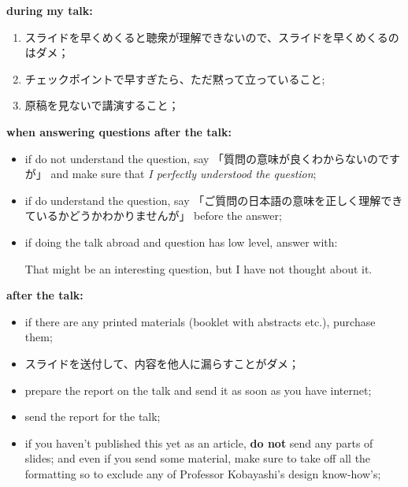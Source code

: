 \documentclass[12pt]{article} %
\begin{document}
    \textbf{during my talk:}\begin{enumerate}
	    \item スライドを早くめくると聴衆が理解できないので、スライドを早くめくるのはダメ；
	    \item チェックポイントで早すぎたら、ただ黙って立っていること;
	    \item 原稿を見ないで講演すること；
    \end{enumerate}
	\textbf{when answering questions after the talk:}
	\begin{itemize}
		\item if do not understand the question, say 「質問の意味が良くわからないのですが」 and make sure that \textit{I perfectly understood the question};
		\item if do understand the question, say 「ご質問の日本語の意味を正しく理解できているかどうかわかりませんが」 before the answer;
		\item if doing the talk abroad and question has low level, answer with:\begin{center}
				That might be an interesting question,
				but I have not thought about it.
			\end{center}
	\end{itemize}
	\textbf{after the talk:}
	\begin{itemize}
		\item if there are any printed materials (booklet with abstracts etc.), purchase them;
		\item スライドを送付して、内容を他人に漏らすことがダメ；
		\item prepare the report on the talk and send it as soon as you have internet;
        \item send the report for the talk;
        \item if you haven't published this yet as an article, \textbf{do not} send any parts of slides;
            and even if you send some material, make sure to take off all the formatting so to exclude
            any of Professor Kobayashi's design know-how's;
	\end{itemize}
\end{document}
